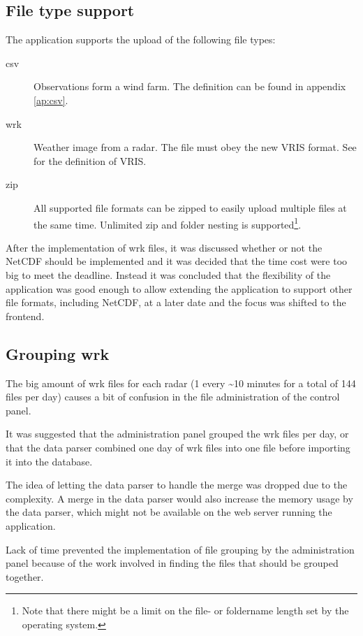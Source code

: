 \subsection{File type support}
The application supports the upload of the following file types:
\begin{description}
\item[csv] Observations form a wind farm. The definition can be found in appendix \ref{ap:csv}.
\item[wrk] Weather image from a radar. The file must obey the new VRIS format. See \cite{VRIS} for the definition of VRIS.
\item[zip] All supported file formats can be zipped to easily upload multiple files at the same time. Unlimited zip and folder nesting is supported\footnote{Note that there might be a limit on the file- or foldername length set by the operating system.}.
\end{description}
After the implementation of wrk files, it was discussed whether or not the NetCDF should be implemented and it was decided that the time cost were too big to meet the deadline. Instead it was concluded that the flexibility of the application was good enough to allow extending the application to support other file formats, including NetCDF, at a later date and the focus was shifted to the frontend.

\subsection{Grouping wrk}
The big amount of wrk files for each radar (1 every \textasciitilde 10 minutes for a total of 144 files per day) causes a bit of confusion in the file administration of the control panel.

It was suggested that the administration panel grouped the wrk files per day, or that the data parser combined one day of wrk files into one file before importing it into the database.

The idea of letting the data parser to handle the merge was dropped due to the complexity. A merge in the data parser would also increase the memory usage by the data parser, which might not be available on the web server running the application.

Lack of time prevented the implementation of file grouping by the administration panel because of the work involved in finding the files that should be grouped together.

